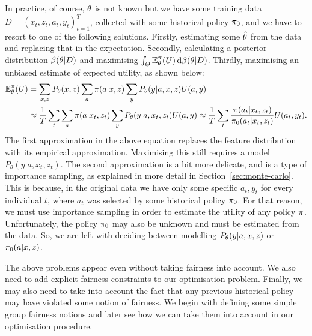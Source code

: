 \documentclass{beamer}
\begin{document}
\begin{frame}
{    
    In practice, of course, $\theta$ is not known but we have some training data $D = (x_t, z_t, a_t, y_t)_{t=1}^T$, collected with some historical policy $\pi_0$, and  we have to resort to one of the following solutions. Firstly, estimating some $\hat{\theta}$ from the data and replacing that in the expectation. Secondly, calculating a posterior distribution $\beta(\theta | D)$ and maximising $\int_\Theta \mathop{\mbox{\ensuremath{\mathbb{E}}}}\nolimits_\theta^\pi(U) \,\mathrm{d} \beta(\theta | D)$. Thirdly, maximising an unbiased estimate of expected utility, as shown below:
    \begin{align*}
      \mathop{\mbox{\ensuremath{\mathbb{E}}}}\nolimits^\pi_\theta(U)
      &=
        \sum_{x,z} P_\theta(x, z) \sum_a \pi(a | x, z) \sum_y P_\theta(y | a, x, z) U(a,y) \\
      &\approx
        \frac{1}{T} \sum_{t} \sum_a \pi(a | x_t, z_t) \sum_y P_\theta(y | a, x_t, z_t) U(a,y)
        \approx
        \frac{1}{T} \sum_{t} \frac{\pi(a_t | x_t, z_t)}{\pi_0(a_t | x_t, z_t)} U(a_t,y_t).
    \end{align*}
    The first approximation in the above equation replaces the feature distribution with its empirical approximation. Maximising this still requires a model $P_\theta(y | a, x_t, z_t)$.
    The second approximation is a bit more delicate, and is a type of importance sampling, as explained in more detail in Section~\ref{sec:monte-carlo}.
    This is because, in the original data we have only some specific $a_t, y_t$ for every individual $t$, where $a_t$ was selected by some historical policy $\pi_0$. For that reason, we must use importance sampling in order to estimate the utility of any policy $\pi$. Unfortunately, the policy $\pi_0$ may also be unknown and must be estimated from the data. So, we are left with deciding between modelling $P_\theta(y | a, x, z)$ or $\pi_0(a | x, z)$.

    The above problems appear even without taking fairness into account. We also need to add explicit fairness constraints to our optimisation problem. Finally, we may also need to take into account the fact that any previous historical policy may have violated some notion of fairness. We begin with defining some simple group fairness notions and later see how we can take them into account in our optimisation procedure.
  }
\end{frame}  
\end{document}
